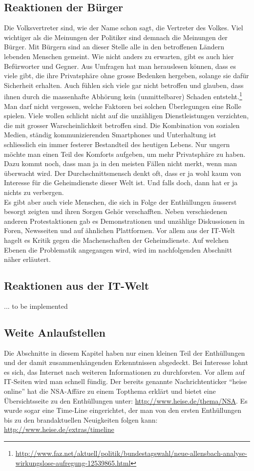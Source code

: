\subsection{Reaktionen der Bürger}
Die Volksvertreter sind, wie der Name schon sagt, die Vertreter des Volkes. Viel wichtiger als die Meinungen der Politiker sind demnach die Meinungen der Bürger. Mit Bürgern sind an dieser Stelle alle in den betroffenen Ländern lebenden Menschen gemeint. Wie nicht anders zu erwarten, gibt es auch hier Befürworter und Gegner. Aus Umfragen hat man herauslesen können, dass es viele gibt, die ihre Privatsphäre ohne grosse Bedenken hergeben, solange sie dafür Sicherheit erhalten. Auch fühlen sich viele gar nicht betroffen und glauben, dass ihnen durch die massenhafte Abhörung kein (unmittelbarer) Schaden entsteht.\footnote{\url{http://www.faz.net/aktuell/politik/bundestagswahl/neue-allensbach-analyse-wirkungslose-aufregung-12539865.html}}
\\
Man darf nicht vergessen, welche Faktoren bei solchen Überlegungen eine Rolle spielen. Viele wollen schlicht nicht auf die unzähligen Dienstleistungen verzichten, die mit grosser Warscheinlichkeit betroffen sind. Die Kombination von sozialen Medien, ständig kommunizierenden Smartphones und Unterhaltung ist schliesslich ein immer festerer Bestandteil des heutigen Lebens. Nur ungern möchte man einen Teil des Komforts aufgeben, um mehr Privatsphäre zu haben. Dazu kommt noch, dass man ja in den meisten Fällen nicht merkt, wenn man überwacht wird. Der Durchschnittsmensch denkt oft, dass er ja wohl kaum von Interesse für die Geheimdienste dieser Welt ist. Und falls doch, dann hat er ja nichts zu verbergen.
\\
Es gibt aber auch viele Menschen, die sich in Folge der Enthüllungen äusserst besorgt zeigten und ihren Sorgen Gehör verschafften. Neben verschiedenen anderen Protestaktionen gab es Demonstrationen und unzählige Diskussionen in Foren, Newsseiten und auf ähnlichen Plattformen. Vor allem aus der IT-Welt hagelt es Kritik gegen die Machenschaften der Geheimdienste. Auf welchen Ebenen die Problematik angegangen wird, wird im nachfolgenden Abschnitt näher erläutert.

\subsection{Reaktionen aus der IT-Welt}
... to be implemented

\subsection{Weite Anlaufstellen}
Die Abschnitte in diesem Kapitel haben nur einen kleinen Teil der Enthüllungen und der damit zusammenhängenden Erkenntnissen abgedeckt. Bei Interesse lohnt es sich, das Internet nach weiteren Informationen zu durchforsten. Vor allem auf IT-Seiten wird man schnell fündig. Der bereits genannte Nachrichtenticker ``heise online'' hat die NSA-Affäre zu einem Topthema erklärt und bietet eine Übersichtsseite zu den Enthüllungen unter: \url{http://www.heise.de/thema/NSA}. Es wurde sogar eine Time-Line eingerichtet, der man von den ersten Enthüllungen bis zu den brandaktuellen Neuigkeiten folgen kann: \url{http://www.heise.de/extras/timeline}